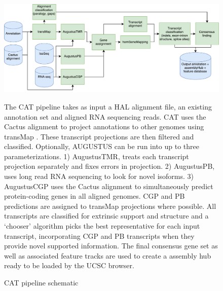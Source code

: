 \documentclass[fleqn,10pt]{wlscirep}
\begin{document}
\begin{figure}
\centering
\includegraphics[width=\textwidth,height=\textheight,keepaspectratio]{CAT.pdf}
\caption{CAT pipeline schematic}
The CAT pipeline takes as input a HAL alignment file, an existing annotation set and aligned RNA sequencing reads. CAT uses the Cactus alignment to project annotations to other genomes using transMap \cite{stanke2008using}. These transcript projections are then filtered and classified. Optionally, AUGUSTUS can be run into up to three parameterizations. 1) AugustusTMR, treats each transcript projection separately and fixes errors in projection. 2) AugustusPB, uses long read RNA sequencing to look for novel isoforms. 3) AugustusCGP \cite{konig2015simultaneous} uses the Cactus alignment to simultaneously predict protein-coding genes in all aligned genomes. CGP and PB predictions are assigned to transMap projections where possible. All transcripts are classified for extrinsic support and structure and a ‘chooser’ algorithm picks the best representative for each input transcript, incorporating CGP and PB transcripts when they provide novel supported information. The final consensus gene set as well as associated feature tracks are used to create a assembly hub ready to be loaded by the UCSC browser.
\label{fig:pipeline}
\end{figure}
\end{document}
